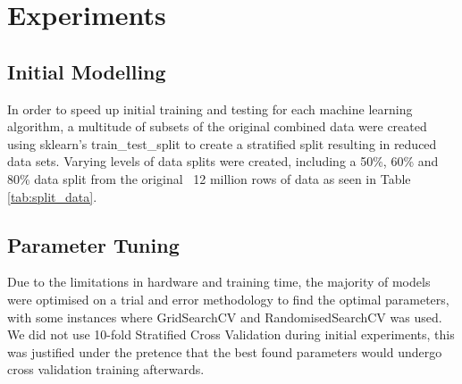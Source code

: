 
\section{Experiments}
\label{sec: Experiments}

\subsection{Initial Modelling}
In order to speed up initial training and testing for each machine learning algorithm, a multitude of subsets of the original combined data were created using sklearn's train\_test\_split to create a stratified split resulting in reduced data sets. Varying levels of data splits were created, including a 50\%, 60\% and 80\% data split from the original ~12 million rows of data as seen in Table \ref{tab:split_data}. 


\subsection{Parameter Tuning}
Due to the limitations in hardware and training time, the majority of models were optimised on a trial and error methodology to find the optimal parameters, with some instances where GridSearchCV and RandomisedSearchCV was used. We did not use 10-fold Stratified Cross Validation during initial experiments, this was justified under the pretence that the best found parameters would undergo cross validation training afterwards.

